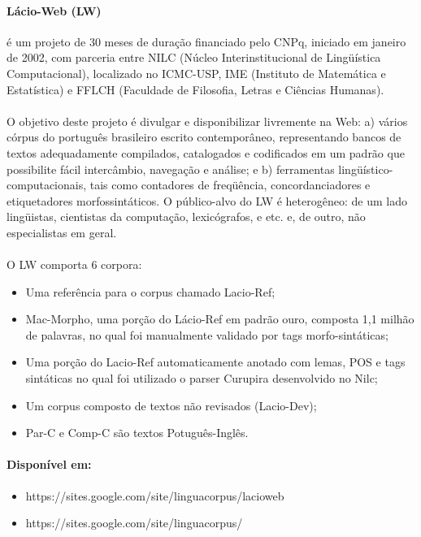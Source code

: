 \documentclass[a4paper, 10pt]{article}
\begin{document}
            	\paragraph{Lácio-Web (LW)}
            	é um projeto de 30 meses de duração financiado pelo CNPq, iniciado em janeiro de 2002, com parceria entre NILC (Núcleo Interinstitucional de Lingüística Computacional), localizado no ICMC-USP, IME (Instituto de Matemática e Estatística) e FFLCH (Faculdade de Filosofia, Letras e Ciências Humanas).
                \paragraph{}
                O objetivo deste projeto é divulgar e disponibilizar livremente na Web: a) vários córpus do português brasileiro escrito contemporâneo, representando bancos de textos adequadamente compilados, catalogados e codificados em um padrão que possibilite fácil intercâmbio, navegação e análise; e b) ferramentas lingüístico-computacionais, tais como contadores de freqüência, concordanciadores e etiquetadores morfossintáticos. O público-alvo do LW é heterogêneo: de um lado lingüistas, cientistas da computação, lexicógrafos, e etc. e, de outro, não especialistas em geral.
                \paragraph{}O LW comporta 6 corpora:
                \begin{itemize}
                	\item Uma referência para o corpus chamado Lacio-Ref;
                    \item Mac-Morpho, uma porção do Lácio-Ref em padrão ouro, composta 1,1 milhão de palavras, no qual foi manualmente validado por tags morfo-sintáticas;
                    \item Uma porção do Lacio-Ref automaticamente anotado com lemas, POS e tags sintáticas no qual foi utilizado o parser Curupira desenvolvido no Nilc; 
                    \item Um corpus composto de textos não revisados (Lacio-Dev);
                    \item Par-C e Comp-C são textos Potuguês-Inglês.
                \end{itemize}
                \paragraph{Disponível em:}
            	\begin{itemize}
				    \item https://sites.google.com/site/linguacorpus/lacioweb
                    \item https://sites.google.com/site/linguacorpus/
			    \end{itemize}
\end{document}
